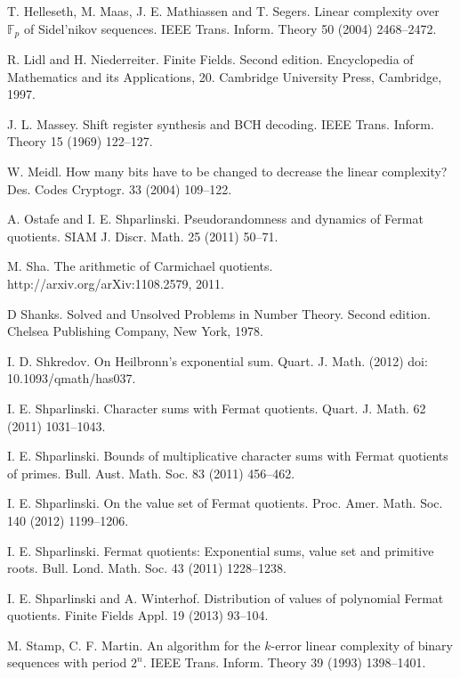 \documentclass [11pt,a4paper]{article}
\def\F{\mathbb{F}}
\begin{document}
\begin{thebibliography}{99}
T. Helleseth, M. Maas, J. E. Mathiassen and  T. Segers. Linear complexity over $\F_p$ of Sidel'nikov sequences. IEEE Trans. Inform. Theory 50 (2004)  2468--2472.



 R. Lidl and H. Niederreiter. Finite Fields.
Second edition. Encyclopedia of Mathematics and its Applications, 20. Cambridge University Press, Cambridge, 1997.




 J. L. Massey. Shift register synthesis and BCH decoding. IEEE Trans. Inform.
Theory 15 (1969) 122--127.



 W. Meidl. How many bits have to be changed to decrease the linear
complexity? Des. Codes Cryptogr. 33 (2004) 109--122.







 A. Ostafe  and  I. E. Shparlinski. Pseudorandomness and dynamics of
Fermat quotients. SIAM J. Discr. Math. 25 (2011) 50--71.



M. Sha. The arithmetic of Carmichael quotients. http://arxiv.org/arXiv:1108.2579, 2011.

D Shanks. Solved and Unsolved Problems in Number Theory. Second edition. Chelsea
Publishing Company, New York, 1978.

I. D. Shkredov. On Heilbronn's exponential sum. Quart. J. Math. (2012) doi: 10.1093/qmath/has037.



I. E. Shparlinski. Character sums with Fermat quotients. Quart. J. Math. 62 (2011) 1031--1043.

 I. E. Shparlinski.  Bounds of multiplicative character sums with
Fermat quotients of primes. Bull. Aust. Math. Soc. 83 (2011)
456--462.

 I. E. Shparlinski.  On the value set of Fermat
quotients. Proc. Amer. Math. Soc. 140 (2012) 1199--1206.

 I. E. Shparlinski.  Fermat quotients: Exponential sums, value set and primitive
roots. Bull. Lond. Math. Soc.  43 (2011) 1228--1238.

I. E. Shparlinski  and A. Winterhof. Distribution of values of
polynomial Fermat quotients. Finite Fields Appl. 19 (2013)
93--104.




M. Stamp, C. F. Martin. An algorithm for the $k$-error linear complexity of
 binary sequences with period $2^n$. IEEE Trans. Inform. Theory 39 (1993)  1398--1401.


\end{thebibliography}
\end{document}
